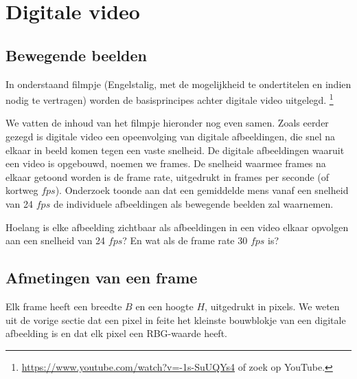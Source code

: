 \section{Digitale video}
\label{sec:Mod3_Sec2}
%

\subsection{Bewegende beelden}

In onderstaand filmpje (Engelstalig, met de mogelijkheid te ondertitelen en indien nodig te vertragen) worden de basisprincipes achter digitale video uitgelegd. \footnote{\url{https://www.youtube.com/watch?v=-1s-SuUQYs4} of zoek  op YouTube.} 


We vatten de inhoud van het filmpje hieronder nog even samen. Zoals eerder gezegd is digitale video een opeenvolging van digitale afbeeldingen, die snel na elkaar in beeld komen tegen een vaste snelheid.
De digitale afbeeldingen waaruit een video is opgebouwd, noemen we frames.
De snelheid waarmee frames na elkaar getoond worden is de frame rate, uitgedrukt in frames per seconde (of kortweg $fps$).
Onderzoek toonde aan dat een gemiddelde mens vanaf een snelheid van 24 $fps$ de individuele afbeeldingen als bewegende beelden zal waarnemen.

\begin{oef}
	Hoelang is elke afbeelding zichtbaar als afbeeldingen in een video elkaar opvolgen aan een snelheid van 24 $fps$? 
	En wat als de frame rate 30 $fps$ is?
\end{oef}

\subsection{Afmetingen van een frame}

Elk frame heeft een breedte $B$ en een hoogte $H$, uitgedrukt in pixels.
We weten uit de vorige sectie dat een pixel in feite het kleinste bouwblokje van een digitale afbeelding is en dat elk pixel een RBG-waarde heeft.

